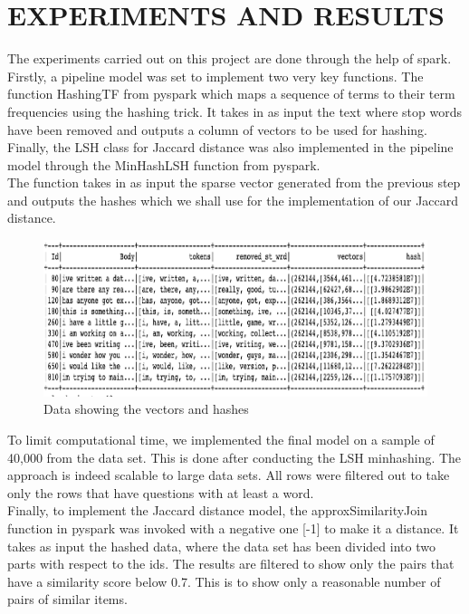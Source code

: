 \documentclass[12pt]{article}
\begin{document}
	\section{EXPERIMENTS AND RESULTS}
	The experiments carried out on this project are done through the help of spark. Firstly, a pipeline model was set to implement two very key functions. The function HashingTF from pyspark which maps a sequence of terms to their term frequencies using the hashing trick. It takes in as input the text where stop words have been removed and outputs a column of vectors to be used for hashing. Finally, the LSH class for Jaccard distance was also implemented in the pipeline model through the MinHashLSH function from pyspark.
\\
	The function takes in as input the sparse vector generated from the previous step and outputs the hashes which we shall use for the implementation of our Jaccard distance.
\\
			\begin{figure}[H]
		\includegraphics[scale=0.9]{hash.png}
		\centering
		\caption{Data showing the vectors and hashes}
		\label{fig:hash}
	\end{figure}
	To limit computational time, we implemented the final model on a sample of 40,000 from the data set. This is done after conducting the LSH minhashing. The approach is indeed scalable to large data sets. All rows were filtered out to take only the rows that have questions with at least a word.\\
	Finally, to implement the Jaccard distance model, the approxSimilarityJoin function in pyspark was invoked with a negative one [-1] to make it a distance. It takes as input the hashed data, where the data set has been divided into two parts with respect to the ids. The results are filtered to show only the pairs that have a similarity score below 0.7. This is to show only a reasonable number of pairs of similar items. \\
\end{document}
